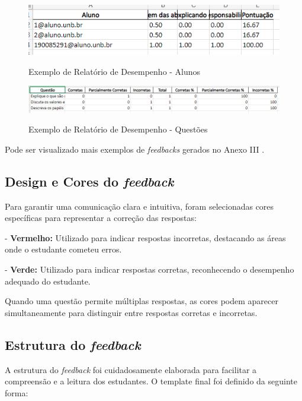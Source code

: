 \begin{figure}[H]
    \centering
    \caption{Exemplo de Relatório de Desempenho - Alunos}
    \includegraphics[width=1\textwidth]{figuras/report.png}
    \label{fig:report}
\end{figure}

\begin{figure}[H]
    \centering
    \caption{Exemplo de Relatório de Desempenho - Questões}
    \includegraphics[width=1\textwidth]{figuras/report_questions.png}
    \label{fig:report_questions}
\end{figure}

Pode ser visualizado mais exemplos de \textit{feedbacks} gerados no Anexo III .

\subsection{Design e Cores do \textit{feedback}}

Para garantir uma comunicação clara e intuitiva, foram selecionadas cores específicas para representar a correção das respostas:

- \textbf{Vermelho:} Utilizado para indicar respostas incorretas, destacando as áreas onde o estudante cometeu erros.

- \textbf{Verde:} Utilizado para indicar respostas corretas, reconhecendo o desempenho adequado do estudante.

Quando uma questão permite múltiplas respostas, as cores podem aparecer simultaneamente para distinguir entre respostas corretas e incorretas.

\subsection{Estrutura do \textit{feedback}}

A estrutura do \textit{feedback} foi cuidadosamente elaborada para facilitar a compreensão e a leitura dos estudantes. O template final foi definido da seguinte forma:

